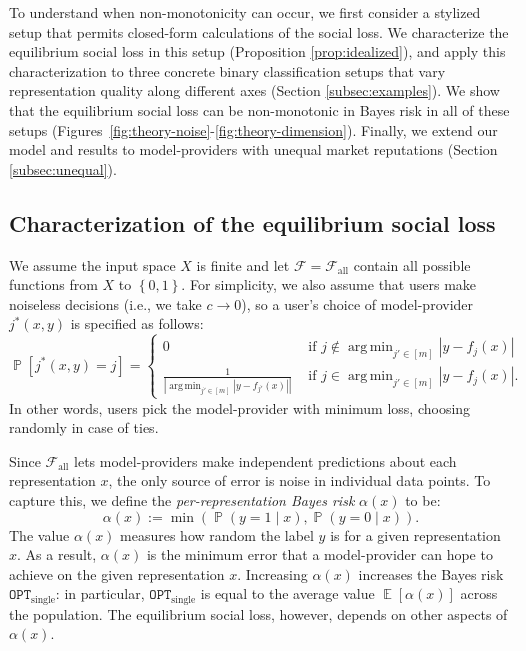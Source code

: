 \documentclass[letterpaper,11pt]{article}
\theoremstyle{plain}
\DeclareMathOperator*{\argmin}{arg\,min}
\DeclareMathOperator*{\E}{\mathbb{E}}
\DeclareMathOperator*{\Prob}{\mathbb{P}}
\begin{document}
To understand when non-monotonicity can occur, we first consider a stylized setup that permits closed-form calculations of the social loss. We characterize the equilibrium social loss in this setup (Proposition \ref{prop:idealized}), and apply this characterization to three concrete binary classification setups that vary representation quality along different axes (Section \ref{subsec:examples}). We show that the equilibrium social loss can be non-monotonic in Bayes risk in all of these setups (Figures~\ref{fig:theory-noise}-\ref{fig:theory-dimension}). Finally, we extend our model and results to model-providers with unequal market reputations (Section \ref{subsec:unequal}).



\subsection{Characterization of the equilibrium social loss}\label{subsec:idealized}
We assume the input space $X$ is finite and let $\mathcal{F} = \mathcal{F}_{\text{all}}$ contain {all possible functions} from $X$ to $\left\{0,1\right\}$. For simplicity, we also assume that users make noiseless decisions (i.e., we take $c \rightarrow 0$), so a user's choice of model-provider $j^*(x,y)$ is specified as follows: 
\begin{equation}
    \label{eq:userchoicespecific}
    \Prob[j^*(x,y) = j] = 
\begin{cases}
0 & \text{ if } j \not\in \argmin_{j' \in [m]} |y-f_j(x)| \\
\frac{1}{\left|\argmin_{j' \in [m]} |y-f_{j'}(x)| \right|}
& \text{ if } j \in \argmin_{j' \in [m]} |y-f_j(x)|.
\end{cases}
\end{equation}
In other words, users pick the model-provider with minimum loss, choosing randomly in case of ties.

Since $\mathcal{F}_{\text{all}}$ lets model-providers make independent predictions about each representation $x$, the only source of error is noise in individual data points. To capture this, we define the \emph{per-representation Bayes risk} $\alpha(x)$ to be: 
\begin{equation}
\label{eq:alphabayes}
 \alpha(x) := \min(\Prob(y = 1 \mid x), \Prob(y = 0 \mid x)). 
\end{equation}
The value $\alpha(x)$ measures how random the label $y$ is for a given representation $x$. As a result, $\alpha(x)$ is the minimum error that a model-provider can hope to achieve on the given representation $x$. Increasing $\alpha(x)$ increases the Bayes risk $\texttt{OPT}_{\text{single}}$: in particular,  $\texttt{OPT}_{\text{single}}$ is equal to the average value $\E[\alpha(x)]$ across the population. The equilibrium social loss, however, depends on other aspects of $\alpha(x)$.
\end{document}
